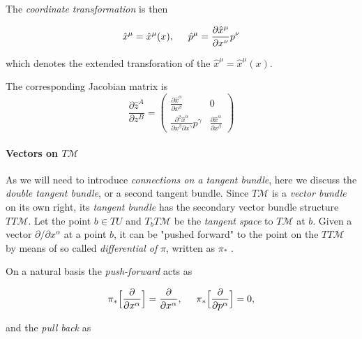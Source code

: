 The \textit{coordinate transformation} is then

\begin{equation}
\hat{x}^{\mu} = \hat{x}^{\mu}(x), \hspace{5mm} \hat{p}^{\mu} = \frac{\partial\hat{x}^{\mu}}{\partial x^{\nu}}p^{\nu}
\end{equation}

which denotes the extended transforation of the $\hat{x}^{\mu} = \hat{x}^{\mu}(x)$.

The corresponding Jacobian matrix is 
\renewcommand\arraystretch{1.6} %
\begin{equation}
\frac{\partial\hat{z}^A}{\partial z^B} = 
\begin{pmatrix}
\frac{\partial\hat{x}^{\alpha}}{\partial x^{\beta}} & 0 \\
\frac{\partial^2\hat{x}^{\alpha}}{\partial x^{\beta} \partial x^{\gamma}}p^{\gamma} & \frac{\partial\hat{x}^{\alpha}}{\partial x^{\beta}} 
\end{pmatrix}
\end{equation}
\renewcommand\arraystretch{1.0}


\paragraph{Vectors on $T\mathcal{M}$}


As we will need to introduce \textit{connections on a tangent bundle}, here we discuss the \textit{double tangent bundle}, or a second tangent bundle. 
Since $T\mathcal{M}$ is a \textit{vector bundle} on its own right, its \textit{tangent bundle} has the secondary vector bundle structure $TT\mathcal{M}$. 
Let the point $b\in TU$ and $T_b T\mathcal{M}$ be the \textit{tangent space} to $T\mathcal{M}$ at $b$.
Given a vector $\partial/\partial x^{\alpha}$ at a point $b$, it can be "pushed forward" to the point on the $TT\mathcal{M}$ by means of so called \textit{differential of} $\pi$, written as $\pi_*$ \cite{Frankel:2002}.

On a natural basis the \textit{push-forward} acts as 

\begin{equation}
\pi_*\Big[\frac{\partial}{\partial x^{\alpha}}\Big] = \frac{\partial}{\partial x^{\alpha}}, \hspace{5mm} \pi_* \Big[\frac{\partial}{\partial p^{\alpha}}\Big] = 0,
\end{equation}

and the \textit{pull back} as  

